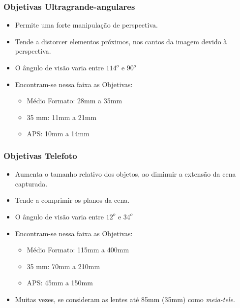 \begin{frame}
    \frametitle{Objetivas Ultragrande-angulares}
    \begin{itemize}
        \item Permite uma forte manipulação de perspectiva.
        \item Tende a distorcer elementos próximos, nos cantos da imagem devido à perspectiva.
        \item O ângulo de visão varia entre $114^o$ e $90^o$
        \item Encontram-se nessa faixa as Objetivas:

        {\small \begin{itemize}
            \item Médio Formato: 28mm a 35mm
            \item 35 mm: 11mm a 21mm
            \item APS: 10mm a 14mm
        \end{itemize}}
    \end{itemize}
\end{frame}

\begin{frame}
    \frametitle{Objetivas Telefoto}
    \begin{itemize}
        \item Aumenta o tamanho relativo dos objetos, ao diminuir a extensão da cena capturada.
        \item Tende a comprimir os planos da cena.
        \item O ângulo de visão varia entre $12^o$ e $34^o$
        \item Encontram-se nessa faixa as Objetivas:

        {\small \begin{itemize}
            \item Médio Formato: 115mm a 400mm
            \item 35 mm: 70mm a 210mm
            \item APS: 45mm a 150mm
        \end{itemize}}
        \item Muitas vezes, se consideram as lentes até 85mm (35mm) como \textit{meia-tele}.
    \end{itemize}
\end{frame}


